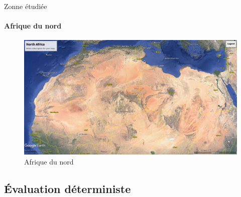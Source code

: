 \begin{frame}{Zonne étudiée}
\framesubtitle{Afrique du nord}
\begin{figure}
    \centering
    \includegraphics[width=0.75\linewidth]{north_africa.jpg}
    \caption{Afrique du nord}
    \label{fig:enter-label}
\end{figure}
\end{frame}
\subsection{Évaluation déterministe}

